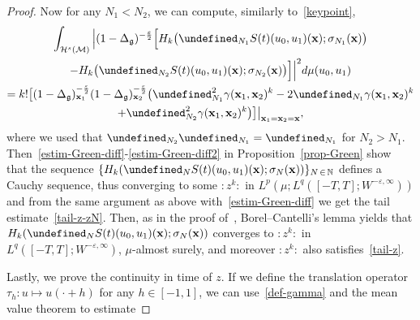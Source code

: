 \documentclass[AHL,Unicode,longabstracts,published]{cedram}
\renewcommand{\th}{\tau_h}
\newcommand{\N}{\mathbb{N}}
\let\P= \undefined
\newcommand{\P}{\mathbf{P}}
\newcommand{\x}{\mathbf{x}}
\newcommand{\M}{\mathcal{M}}
\renewcommand{\H}{\mathcal{H}}
\newcommand{\g}{\mathfrak{g}}
\newcommand{\Dlg}{\Delta_{\g}}
\newcommand{\eps}{\varepsilon}
\newcommand{\s}{\sigma}
\begin{document}
\begin{proof}
Now for any $N_1< N_2$, we can compute, similarly to~\eqref{keypoint},
\begin{multline*}
\int_{\H^s(\M)}\Big|(1-\Dlg)^{-\frac\eps2}\Big[H_k\big(\P_{N_1}S(t)(u_0,u_1)(\x);\s_{N_1}(\x)\big)\\
-H_k\big(\P_{N_2}S(t)(u_0,u_1)(\x);\s_{N_2}(\x)\big)\Big]\Big|^2d\mu(u_0,u_1)\\
=k!\big[(1-\Dlg)_{\x_1}^{-\frac\eps2}(1-\Dlg)_{\x_2}^{-\frac\eps2}\big(\P_{N_1}^2\gamma(\x_1,\x_2)^k-2\P_{N_1}\gamma(\x_1,\x_2)^k\\
+\P_{N_2}^2\gamma(\x_1,\x_2)^k\big)\big]\big|_{\x_1=\x_2=\x},
\end{multline*}
where we used that $\P_{N_2}\P_{N_1}=\P_{N_1}$ for $N_2> N_1$. Then~\eqref{estim-Green-diff}-\eqref{estim-Green-diff2} in Proposition~\ref{prop-Green} show that the sequence $\{H_k(\P_{N}S(t)(u_0,u_1)(\x);\s_{N}(\x))\}_{N\,\in\,\N}$ defines a Cauchy sequence, thus converging to some $:z^k:$ in $L^p(\mu;L^q([-T,T];W^{-\eps,\infty}))$ and from the same argument as above with~\eqref{estim-Green-diff} we get the tail estimate~\eqref{tail-z-zN}. Then, as in the proof of~\cite[Proposition~3.2]{OPT}, Borel--Cantelli's lemma yields that $H_k(\P_{N}S(t)(u_0,u_1)(\x);\s_{N}(\x))$ converges to $:z^k:$ in $L^q([-T,T];W^{-\eps,\infty})$, $\mu$-almost surely, and moreover $:z^k:$ also satisfies~\eqref{tail-z}.

Lastly, we prove the continuity in time of $z$. If we define the translation operator $\th: u \mapsto u(\cdot+h)$ for any $h \in [-1,1]$, we can use~\eqref{def-gamma} and the mean value theorem to estimate


\end{proof}
\end{document}
